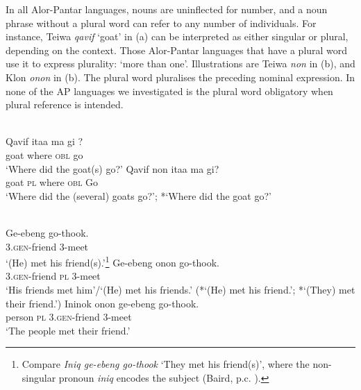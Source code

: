 In all Alor-Pantar languages, nouns are uninflected for number, and a noun phrase without a plural word can refer to any number of individuals. For instance, Teiwa \textit{qavif} `goat' in (a) can be interpreted as either singular or plural, depending on the context. Those Alor-Pantar languages that have a plural word use it to express plurality: `more than one'. Illustrations are Teiwa \textit{non} in (b), and Klon \textit{onon} in (b). The plural word pluralises the preceding nominal expression. In none of the AP languages we investigated is the plural word obligatory when plural reference is intended.

\ea
{} \\
\label{bkm:Ref334184518}
\ea
\gll  Qavif ita{{\textglotstop}}{a} ma gi ? \\
 goat where \textsc{obl} go \\
\glt `Where did the goat(s) go?'
\ex
\gll Qavif non ita{{\textglotstop}}a  ma gi? \\
 goat \textsc{pl} where \textsc{obl} Go \\
\glt `Where did the (several) goats go?';  *`Where did the goat go?'
\z
\z

\ea\label{bkm:Ref354060976}
 \\
  \ea
  \gll Ge-ebeng go-thook. \\
  3.\textsc{gen}-friend 3-meet \\
\glt `(He) met his friend(s).'\footnote{  Compare \textit{Iniq ge-ebeng go-thook} `They met his friend(s)', where the non-singular pronoun \textit{iniq} encodes the subject (Baird, p.c. ).}
  \ex
  \gll Ge-ebeng onon go-thook. \\
  3.\textsc{gen}-friend \textsc{pl} 3-meet \\
\glt `His friends met him'/`(He) met his friends.'
  (*`(He) met his friend.'; *`(They) met their friend.')
  \ex
  \gll Ininok onon ge-ebeng go-thook. \\
  person  \textsc{pl} 3.\textsc{gen}-friend 3-meet \\
\glt `The people met their friend.'
  \z
\z

